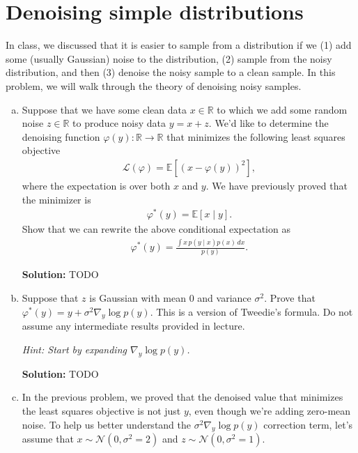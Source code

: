 \documentclass{article}
\newcommand{\Question}[1]{\Large \section{ #1 } \normalsize}
\newenvironment{solution}{\color{blue} \smallskip \textbf{Solution:}}{}
\begin{document}
\fontsize{12}{15}\selectfont

\Question{Denoising simple distributions}

In class, we discussed that it is easier to sample from a distribution if we (1) add some (usually Gaussian) noise to the distribution, (2) sample from the noisy distribution, and then (3) denoise the noisy sample to a clean sample. In this problem, we will walk through the theory of denoising noisy samples. 

\begin{enumerate}[(a)]
\item Suppose that we have some clean data $x \in \mathbb{R} $ to which we add some random noise $z \in \mathbb{R}$ to produce noisy data $y = x + z$. We'd like to determine the denoising function $\varphi(y): \mathbb{R} \rightarrow \mathbb{R}$ that minimizes the following least squares objective
\begin{align*}
    \mathcal{L}(\varphi) = \mathbb{E}\left[(x - \varphi(y))^{2}\right],
\end{align*}
where the expectation is over both $x$ and $y$. We have previously proved that the minimizer is
\begin{align*}
    \varphi^{*}(y) = \mathbb{E}[x \mid y].
\end{align*}
Show that we can rewrite the above conditional expectation as
\begin{align*}
    \varphi^{*}(y) = \frac{\int x \, p(y \mid x) p(x) \, dx}{p(y)}.
\end{align*}

\begin{solution}
TODO
\end{solution}

\clearpage
\item Suppose that $z$ is Gaussian with mean 0 and variance $\sigma^{2}$. Prove that $\varphi^{*}(y) = y + \sigma^{2}\nabla_{y} \log p(y)$. This is a version of Tweedie's formula. Do not assume any intermediate results provided in lecture.

\emph{Hint: Start by expanding $\nabla_{y} \log p(y)$.}

\begin{solution}
TODO
\end{solution}

\clearpage
\item In the previous problem, we proved that the denoised value that minimizes the least squares objective is not just $y$, even though we're adding zero-mean noise. To help us better understand the $\sigma^{2}\nabla_{y} \log p(y)$ correction term, let's assume that $x \sim \mathcal{N}(0, \sigma^{2} = 2)$ and $z \sim \mathcal{N}(0, \sigma^{2} = 1)$. 


\end{enumerate}
\end{document}
